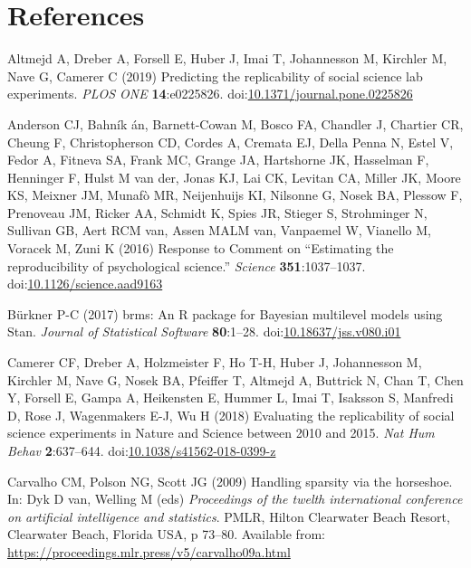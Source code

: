 \documentclass[
  english,
  a4paper,
]{article}
\newlength{\cslhangindent}
\newlength{\cslentryspacingunit} %
\newenvironment{CSLReferences}[2] %
 {%
  \setlength{\parindent}{0pt}
  \ifodd #1
  \let\oldpar\par
  \def\par{\hangindent=\cslhangindent\oldpar}
  \fi
  \setlength{\parskip}{#2\cslentryspacingunit}
 }%
 {}
\begin{document}
\hypertarget{references}{%
\section*{References}\label{references}}

\hypertarget{refs}{}
\begin{CSLReferences}{1}{0}
\leavevmode{}%
Altmejd A, Dreber A, Forsell E, Huber J, Imai T, Johannesson M, Kirchler M, Nave G, Camerer C (2019) Predicting the replicability of social science lab experiments. \emph{PLOS ONE} \textbf{14}:e0225826. doi:\href{https://doi.org/10.1371/journal.pone.0225826}{10.1371/journal.pone.0225826}

\leavevmode{}%
Anderson CJ, Bahník án, Barnett-Cowan M, Bosco FA, Chandler J, Chartier CR, Cheung F, Christopherson CD, Cordes A, Cremata EJ, Della Penna N, Estel V, Fedor A, Fitneva SA, Frank MC, Grange JA, Hartshorne JK, Hasselman F, Henninger F, Hulst M van der, Jonas KJ, Lai CK, Levitan CA, Miller JK, Moore KS, Meixner JM, Munafò MR, Neijenhuijs KI, Nilsonne G, Nosek BA, Plessow F, Prenoveau JM, Ricker AA, Schmidt K, Spies JR, Stieger S, Strohminger N, Sullivan GB, Aert RCM van, Assen MALM van, Vanpaemel W, Vianello M, Voracek M, Zuni K (2016) Response to {Comment} on {``{Estimating} the reproducibility of psychological science.''} \emph{Science} \textbf{351}:1037--1037. doi:\href{https://doi.org/10.1126/science.aad9163}{10.1126/science.aad9163}

\leavevmode{}%
Bürkner P-C (2017) {brms}: An {R} package for {Bayesian} multilevel models using {Stan}. \emph{Journal of Statistical Software} \textbf{80}:1--28. doi:\href{https://doi.org/10.18637/jss.v080.i01}{10.18637/jss.v080.i01}

\leavevmode{}%
Camerer CF, Dreber A, Holzmeister F, Ho T-H, Huber J, Johannesson M, Kirchler M, Nave G, Nosek BA, Pfeiffer T, Altmejd A, Buttrick N, Chan T, Chen Y, Forsell E, Gampa A, Heikensten E, Hummer L, Imai T, Isaksson S, Manfredi D, Rose J, Wagenmakers E-J, Wu H (2018) Evaluating the replicability of social science experiments in {Nature} and {Science} between 2010 and 2015. \emph{Nat Hum Behav} \textbf{2}:637--644. doi:\href{https://doi.org/10.1038/s41562-018-0399-z}{10.1038/s41562-018-0399-z}

\leavevmode{}%
Carvalho CM, Polson NG, Scott JG (2009) Handling sparsity via the horseshoe. In: Dyk D van, Welling M (eds) \emph{Proceedings of the twelth international conference on artificial intelligence and statistics}. PMLR, Hilton Clearwater Beach Resort, Clearwater Beach, Florida USA, p 73--80. Available from: \url{https://proceedings.mlr.press/v5/carvalho09a.html}


\end{CSLReferences}
\end{document}
